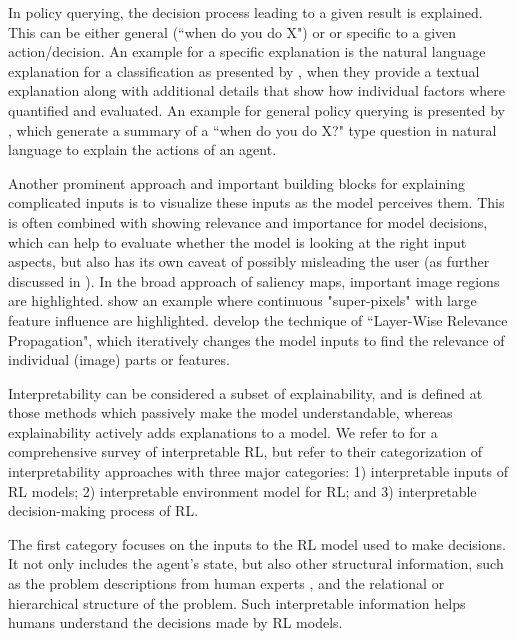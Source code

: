 \documentclass[twoside,11pt]{article}
\begin{document}
In policy querying, the decision process leading to a given result is explained. This can be either general (``when do you do X") or or specific to a given action/decision.
An example for a specific explanation is the natural language explanation for a classification as presented by \citet{AlonsoEtAl:2018:xAINLBeerClassifier}, when they provide a textual explanation along with additional details that show how individual factors where quantified and evaluated.
An example for general policy querying is presented by \citet{HayesShah:2017:AutonomousPolicyExplanation}, which generate a summary of a ``when do you do X?" type question in natural language to explain the actions of an agent.


Another prominent approach and important building blocks for explaining complicated inputs is to visualize these inputs as the model perceives them. This is often combined with showing relevance and importance for model decisions, which can help to evaluate whether the model is looking at the right input aspects, but also has its own caveat of possibly misleading the user (as further discussed in \citet{EvansEtAl:2021:ExplainabilityParadox}).
In the broad approach of saliency maps, important image regions are highlighted. \citet{LiuEtAl:2018:LinearModelUTrees} show an example where continuous "super-pixels" with large feature influence are highlighted. \citet{Bach:2015:LayerWiseRelevancePropagation} develop the technique of ``Layer-Wise Relevance Propagation", which iteratively changes the model inputs to find the relevance of individual (image) parts or features.

Interpretability can be considered a subset of explainability, and is defined at those methods which passively make the model understandable, whereas explainability actively adds explanations to a model. We refer to \cite{GlanoisEtAl:2021:SurveyInterpretableRL} for a comprehensive survey of interpretable RL, but refer to their categorization of interpretability approaches with three major categories: 1) interpretable inputs of RL models; 2) interpretable environment model for RL; and 3) interpretable decision-making process of RL. 

The first category focuses on the inputs to the RL model used to make decisions. It not only includes the agent's state, but also other structural information, such as the problem descriptions from human experts \citep{hasanbeig2021deepsynth}, and the relational \citep{martinez2017relational,battaglia2018relational} or hierarchical structure \citep{andreas2017modular,lyu2019sdrl} of the problem. Such interpretable information helps humans understand the decisions made by RL models.\\
\end{document}

